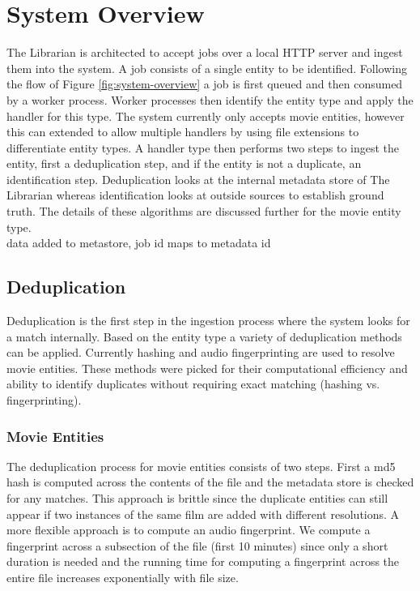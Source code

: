 \documentclass[paper=a4, fontsize=11pt]{scrartcl} %
\numberwithin{equation}{section} %
\numberwithin{figure}{section} %
\numberwithin{table}{section} %
\begin{document}
\section{System Overview}
\label{sec:system-overview}
The Librarian is architected to accept jobs over a local HTTP server and ingest them into the system. A job consists of a single entity to be identified. Following the flow of Figure \ref{fig:system-overview} a job is first queued and then consumed by a worker process. Worker processes then identify the entity type and apply the handler for this type. The system currently only accepts movie entities, however this can extended to allow multiple handlers by using file extensions to differentiate entity types. A handler type then performs two steps to ingest the entity, first a deduplication step, and if the entity is not a duplicate, an identification step. Deduplication looks at the internal metadata store of The Librarian whereas identification looks at outside sources to establish ground truth. The details of these algorithms are discussed further for the movie entity type. \\

data added to metastore, job id maps to metadata id


\subsection{Deduplication}
\label{sec:deduplication}
Deduplication is the first step in the ingestion process where the system looks for a match internally. Based on the entity type a variety of deduplication methods can be applied. Currently hashing and audio fingerprinting are used to resolve movie entities. These methods were picked for their computational efficiency and ability to identify duplicates without requiring exact matching (hashing vs. fingerprinting). \\

\subsubsection{Movie Entities}
\label{sec:dedup-movie-entities}
The deduplication process for movie entities consists of two steps. First a md5 hash is computed across the contents of the file and the metadata store is checked for any matches. This approach is brittle since the duplicate entities can still appear if two instances of the same film are added with different resolutions. A more flexible approach is to compute an audio fingerprint. We compute a fingerprint across a subsection of the file (first 10 minutes) since only a short duration is needed and the running time for computing a fingerprint across the entire file increases exponentially with file size. \\
\end{document}
